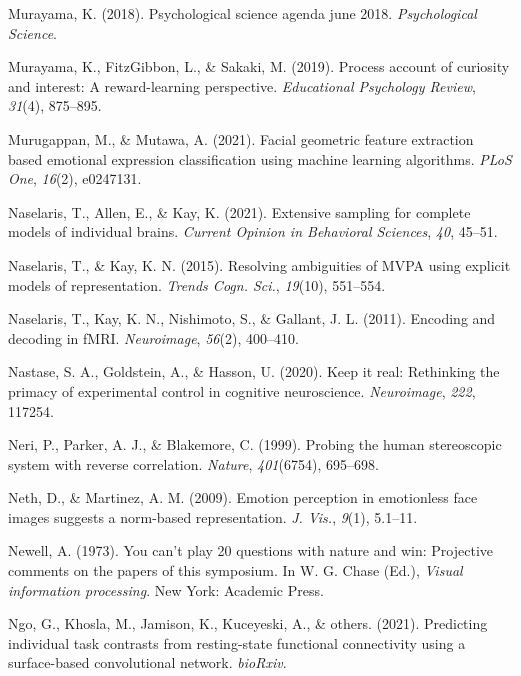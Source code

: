 \documentclass[12pt,american,a4paper,oneside,]{memoir} %
\begin{document}
\leavevmode\hypertarget{ref-murayama2018psychological}{}%
Murayama, K. (2018). Psychological science agenda\textbar{} june 2018. \emph{Psychological Science}.

\leavevmode\hypertarget{ref-murayama2019process}{}%
Murayama, K., FitzGibbon, L., \& Sakaki, M. (2019). Process account of curiosity and interest: A reward-learning perspective. \emph{Educational Psychology Review}, \emph{31}(4), 875--895.

\leavevmode\hypertarget{ref-Murugappan2021-yj}{}%
Murugappan, M., \& Mutawa, A. (2021). Facial geometric feature extraction based emotional expression classification using machine learning algorithms. \emph{PLoS One}, \emph{16}(2), e0247131.

\leavevmode\hypertarget{ref-Naselaris2021-ba}{}%
Naselaris, T., Allen, E., \& Kay, K. (2021). Extensive sampling for complete models of individual brains. \emph{Current Opinion in Behavioral Sciences}, \emph{40}, 45--51.

\leavevmode\hypertarget{ref-Naselaris2015-jn}{}%
Naselaris, T., \& Kay, K. N. (2015). Resolving ambiguities of MVPA using explicit models of representation. \emph{Trends Cogn. Sci.}, \emph{19}(10), 551--554.

\leavevmode\hypertarget{ref-Naselaris2011-oh}{}%
Naselaris, T., Kay, K. N., Nishimoto, S., \& Gallant, J. L. (2011). Encoding and decoding in fMRI. \emph{Neuroimage}, \emph{56}(2), 400--410.

\leavevmode\hypertarget{ref-Nastase2020-he}{}%
Nastase, S. A., Goldstein, A., \& Hasson, U. (2020). Keep it real: Rethinking the primacy of experimental control in cognitive neuroscience. \emph{Neuroimage}, \emph{222}, 117254.

\leavevmode\hypertarget{ref-Neri1999-rj}{}%
Neri, P., Parker, A. J., \& Blakemore, C. (1999). Probing the human stereoscopic system with reverse correlation. \emph{Nature}, \emph{401}(6754), 695--698.

\leavevmode\hypertarget{ref-Neth2009-eh}{}%
Neth, D., \& Martinez, A. M. (2009). Emotion perception in emotionless face images suggests a norm-based representation. \emph{J. Vis.}, \emph{9}(1), 5.1--11.

\leavevmode\hypertarget{ref-Newell1973-no}{}%
Newell, A. (1973). You can't play 20 questions with nature and win: Projective comments on the papers of this symposium. In W. G. Chase (Ed.), \emph{Visual information processing}. New York: Academic Press.

\leavevmode\hypertarget{ref-Ngo2021-kf}{}%
Ngo, G., Khosla, M., Jamison, K., Kuceyeski, A., \& others. (2021). Predicting individual task contrasts from resting-state functional connectivity using a surface-based convolutional network. \emph{bioRxiv}.
\end{document}
